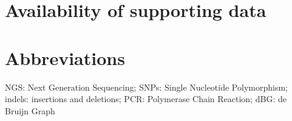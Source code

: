 \documentclass{bmcart}
\begin{document}
\section*{Availability of supporting data}



\section*{Abbreviations}
NGS: Next Generation Sequencing; SNPs: Single Nucleotide Polymorphism; indels: insertions and deletions; PCR: Polymerase Chain Reaction; dBG: de Bruijn Graph






\end{document}

